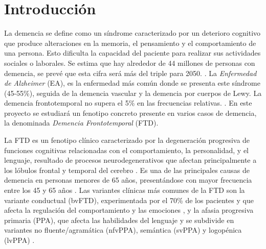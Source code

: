 \section{Introducción}

La demencia se define como un síndrome caracterizado por un deterioro cognitivo que produce alteraciones en la memoria, el pensamiento y el comportamiento de una persona. Esto dificulta la capacidad del paciente para realizar sus actividades sociales o laborales. \cite{Formiga2009} Se estima que hay alrededor de 44 millones de personas con demencia, se prevé que esta cifra será más del triple para 2050. \cite{Long2023}.
La \textit{Enfermedad de Alzheimer} (EA), es la enfermedad más común donde se presenta este síndrome (45-55\%), seguida de la demencia vascular y la demencia por cuerpos de Lewy. La demencia frontotemporal no supera el 5\% en las frecuencias relativas. \cite{GOODMAN201728, GarreOlmo2016}. En este proyecto se estudiará un fenotipo concreto presente en varios casos de demencia, la denominada \textit{Demencia Frontotemporal} (FTD).

La FTD es un fenotipo clínico caracterizado por la degeneración progresiva de funciones cognitivas relacionadas con el comportamiento, la personalidad, y el lenguaje, resultado de procesos neurodegenerativos que afectan principalmente a los lóbulos frontal y temporal del cerebro \cite{snowden2002frontotemporal, ratnavalli2002prevalence, piguet2011behavioural}. Es una de las principales causas de demencia en personas menores de 65 años, presentándose con mayor frecuencia entre los 45 y 65 años \cite{snowden2002frontotemporal, ratnavalli2002prevalence}. Las variantes clínicas más comunes de la FTD son la variante conductual (bvFTD), experimentada por el 70\% de los pacientes y que afecta la regulación del comportamiento y las emociones \cite{snowden2002frontotemporal, piguet2011behavioural}, y la afasia progresiva primaria (PPA), que afecta las habilidades del lenguaje y se subdivide en variantes no fluente/agramática (nfvPPA), semántica (svPPA) y logopénica (lvPPA) \cite{gorno2011classification}.


